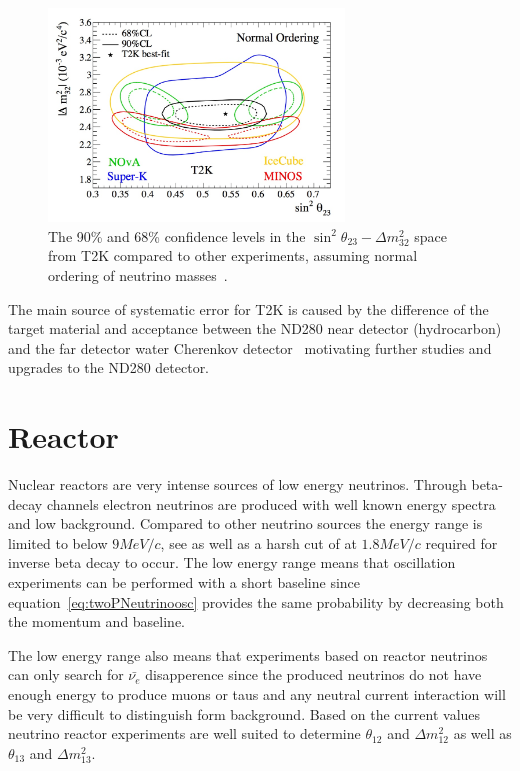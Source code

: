 \begin{figure}[h!]
\centering
  \centering
\includegraphics[width=0.7\textwidth]{figures/t2k2.jpeg}
\vspace{2mm}
\caption{The 90\% and 68\% confidence levels in the $\sin ^2 \theta_{23}-\Delta m^2_{32}$ space from T2K compared to other experiments, assuming normal ordering of neutrino masses~\cite{T2Kfigures}.}
\label{fig:T2K23}
\end{figure}

The main source of systematic error for T2K is caused by the difference of the target material and acceptance between the ND280 near detector (hydrocarbon) and the far detector water Cherenkov detector~\cite{T2Kpaper} motivating further studies and upgrades to the ND280 detector.

\section{Reactor}
Nuclear reactors are very intense sources of low energy neutrinos. Through beta-decay channels electron neutrinos are produced with well known energy spectra and low background. Compared to other neutrino sources the energy range is limited to below $9 MeV/c$, see  as well as a harsh cut of at $1.8 MeV/c$ required for inverse beta decay to occur. The low energy range means that oscillation experiments can be performed with a short baseline since equation~\ref{eq:twoPNeutrinoosc} provides the same probability by decreasing both the momentum and baseline.

The low energy range also means that experiments based on reactor neutrinos can only search for $\bar{\nu_e}$ disapperence since the produced neutrinos do not have enough energy to produce muons or taus and any neutral current interaction will be very difficult to distinguish form background. Based on the current values neutrino reactor experiments are well suited to determine $\theta_{12}$ and $\Delta m_{12}^2 $ as well as  $\theta_{13}$ and $\Delta m_{13}^2 $.

